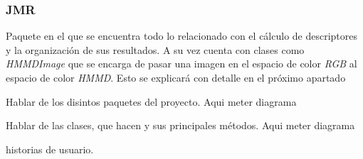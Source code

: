 \subsubsection{JMR}

Paquete en el que se encuentra todo lo relacionado con el cálculo de descriptores y la organización de sus resultados. A su vez cuenta con clases como \textit{HMMDImage} que se encarga de pasar una imagen en el espacio de color \textit{RGB} al espacio de color \textit{HMMD}. Esto se explicará con detalle en el próximo apartado

Hablar de los disintos paquetes del proyecto. Aqui meter diagrama

Hablar de las clases, que hacen y sus principales métodos. Aqui meter diagrama

historias de usuario. 





